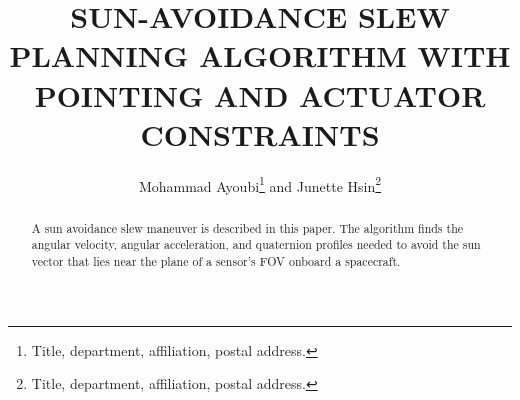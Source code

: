 \documentclass[letterpaper, preprint, paper,11pt]{AAS}	%
\begin{document}
	
	\title{SUN-AVOIDANCE SLEW PLANNING ALGORITHM WITH POINTING AND ACTUATOR CONSTRAINTS}
	
	\author{
		Mohammad Ayoubi\thanks{Title, department, affiliation, postal address.} and Junette Hsin\thanks{Title, department, affiliation, postal address.}
	}
	
	
	\maketitle{} 		
	
	
	\begin{abstract}
		
		A sun avoidance slew maneuver is described in this paper. The algorithm finds the angular velocity, angular acceleration, and quaternion profiles needed to avoid the sun vector that lies near the plane of a sensor's FOV onboard a spacecraft. 
		
		
	\end{abstract}
	
\end{document}
